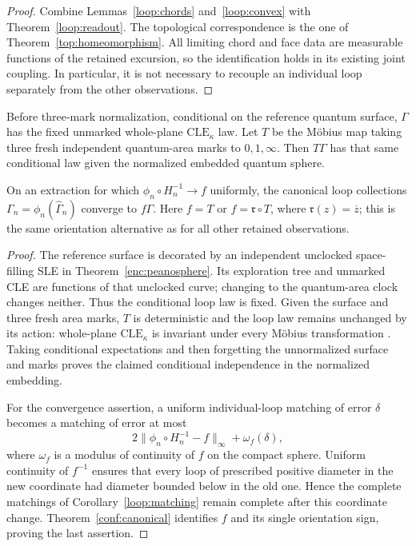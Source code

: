 \begin{proof}
Combine Lemmas~\ref{loop:chords} and~\ref{loop:convex} with
Theorem~\ref{loop:readout}.  The topological correspondence is the
one of Theorem~\ref{top:homeomorphism}.  All limiting chord and face
data are measurable functions of the retained excursion, so the
identification holds in its existing joint coupling.  In particular,
it is not necessary to recouple an individual loop separately from
the other observations.
\end{proof}

\begin{proposition}
\label{loop:canonical}
Before three-mark normalization, conditional on the reference quantum
surface, $\Gamma$ has the fixed unmarked whole-plane
$\mathrm{CLE}_{\kappa}$ law.  Let $T$ be the M\"obius map taking
three fresh independent quantum-area marks to $0,1,\infty$.
Then $T\Gamma$ has that same conditional law given the normalized
embedded quantum sphere.

On an extraction for which $\phi_n\circ H_n^{-1}\to f$ uniformly,
the canonical loop collections $\Gamma_n=\phi_n(\widehat\Gamma_n)$ converge to
$f\Gamma$.  Here $f=T$ or $f=\mathfrak r\circ T$, where
$\mathfrak r(z)=\overline z$; this is the same orientation alternative as
for all other retained observations.
\end{proposition}

\begin{proof}
The reference surface is decorated by an independent unclocked
space-filling SLE in Theorem~\ref{enc:peanosphere}.  Its exploration
tree and unmarked CLE are functions of that unclocked curve;
changing to the quantum-area clock changes neither.  Thus the
conditional loop law is fixed.  Given the surface and three fresh
area marks, $T$ is deterministic and the loop law remains unchanged
by its action: whole-plane $\mathrm{CLE}_{\kappa}$ is invariant
under every M\"obius transformation
\cite[Theorem~1.1]{GwynneMillerQianCLE}.  Taking conditional expectations and
then forgetting the unnormalized surface and marks proves the
claimed conditional independence in the normalized embedding.

For the convergence assertion, a uniform individual-loop matching
of error $\delta$ becomes a matching of error at most
\[
 2\|\phi_n\circ H_n^{-1}-f\|_\infty+\omega_f(\delta),
\]
where $\omega_f$ is a modulus of continuity of $f$ on the compact
sphere.  Uniform continuity of $f^{-1}$ ensures that every loop
of prescribed positive diameter in the new coordinate had diameter
bounded below in the old one.  Hence the complete matchings of
Corollary~\ref{loop:matching} remain complete after this coordinate
change.  Theorem~\ref{conf:canonical} identifies $f$ and its single
orientation sign, proving the last assertion.
\end{proof}
